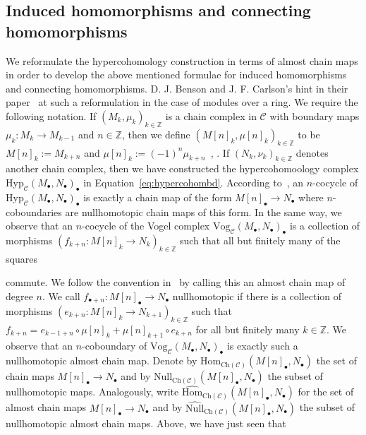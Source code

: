 \documentclass[12pt,a4paper]{article}
\numberwithin{equation}{section}
\theoremstyle{nonumberplain}
\begin{document}
\subsection{Induced homomorphisms and connecting homomorphisms}\label{subsec:hyperindconn}

We reformulate the hypercohomology construction in terms of almost chain maps in order to develop the above mentioned formulae for induced homomorphisms and connecting homomorphisms. D.\! J.\! Benson and J.\! F.\! Carlson's hint in their paper~\cite[p.~109]{ben92} at such a reformulation in the case of modules over a ring. We require the following notation. If $(M_k, \mu_k)_{k \in \mathbb{Z}}$ is a chain complex in $\mathcal{C}$ with boundary maps $\mu_k: M_k \rightarrow M_{k-1}$ and $n \in \mathbb{Z}$, then we define $(M[n]_k, \mu[n]_k)_{k \in \mathbb{Z}}$ to be $M[n]_k := M_{k+n}$ and $\mu[n]_k := (-1)^n \mu_{k+n}$~\cite[p.~154]{gel03}, \cite[p.~9--10]{wei94}. If $(N_k, \nu_k)_{k \in \mathbb{Z}}$ denotes another chain complex, then we have constructed the hypercohomoology complex $\mathrm{Hyp}_{\mathcal{C}}(M_{\bullet}, N_{\bullet})_{\bullet}$ in Equation~\ref{eq:hypercohombd}. According to~\cite[p.~62--63]{wei94}, an $n$-cocycle of $\mathrm{Hyp}_{\mathcal{C}}(M_{\bullet}, N_{\bullet})_{\bullet}$ is exactly a chain map of the form $M[n]_{\bullet} \rightarrow N_{\bullet}$ where $n$-coboundaries are nullhomotopic chain maps of this form. In the same way, we observe that an $n$-cocycle of the Vogel complex $\mathrm{Vog}_{\mathcal{C}}(M_{\bullet}, N_{\bullet})_{\bullet}$ is a collection of morphisms $(f_{k+n}: M[n]_k \rightarrow N_k)_{k \in \mathbb{Z}}$ such that all but finitely many of the squares
\begin{center}
\end{center}
commute. We follow the convention in~\cite[p.~109]{ben92} by calling this an almost chain map of degree $n$. We call $f_{\bullet+n}: M[n]_{\bullet} \rightarrow N_{\bullet}$ nullhomotopic if there is a collection of morphisms $(e_{k+n}: M[n]_k \rightarrow N_{k+1})_{k \in \mathbb{Z}}$ such that $f_{k+n} = e_{k-1+n} \circ \mu[n]_k + \mu[n]_{k+1} \circ e_{k+n}$ for all but finitely many $k \in \mathbb{Z}$. We observe that an $n$-coboundary of $\mathrm{Vog}_{\mathcal{C}}(M_{\bullet}, N_{\bullet})_{\bullet}$ is exactly such a nullhomotopic almost chain map. Denote by $\mathrm{Hom}_{\mathrm{Ch}(\mathcal{C})}(M[n]_{\bullet}, N_{\bullet})$ the set of chain maps $M[n]_{\bullet} \rightarrow N_{\bullet}$ and by $\mathrm{Null}_{\mathrm{Ch}(\mathcal{C})}(M[n]_{\bullet}, N_{\bullet})$ the subset of nullhomotopic maps. Analogously, write $\widehat{\mathrm{Hom}}_{\mathrm{Ch}(\mathcal{C})}(M[n]_{\bullet}, N_{\bullet})$ for the set of almost chain maps $M[n]_{\bullet} \rightarrow N_{\bullet}$ and by $\widehat{\mathrm{Null}}_{\mathrm{Ch}(\mathcal{C})}(M[n]_{\bullet}, N_{\bullet})$ the subset of nullhomotopic almost chain maps. Above, we have just seen that
\end{document}
